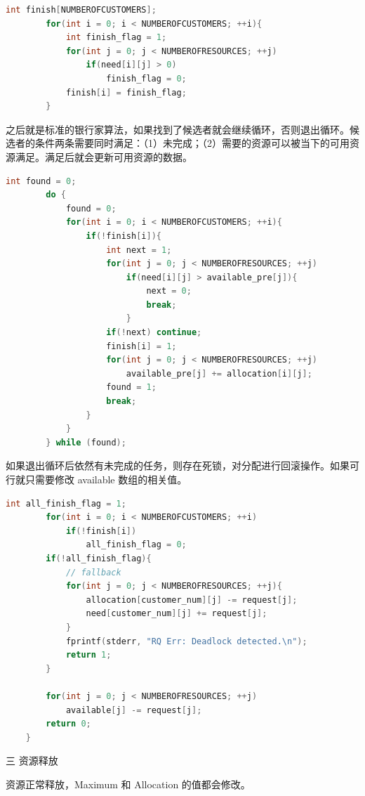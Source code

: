 \documentclass[12pt,a4paper]{article}
\newenvironment{problems}{\begin{list}{}{\renewcommand{\makelabel}[1]{\textbf{##1}\hfil}}}{\end{list}}
\begin{document}
\begin{problems}
\begin{lstlisting}[language=c]
        int finish[NUMBEROFCUSTOMERS];
        for(int i = 0; i < NUMBEROFCUSTOMERS; ++i){
            int finish_flag = 1;
            for(int j = 0; j < NUMBEROFRESOURCES; ++j)
                if(need[i][j] > 0)
                    finish_flag = 0;
            finish[i] = finish_flag;
        }
    \end{lstlisting}

    之后就是标准的银行家算法，如果找到了候选者就会继续循环，否则退出循环。候选者的条件两条需要同时满足：（1）未完成；（2）需要的资源可以被当下的可用资源满足。满足后就会更新可用资源的数据。
    \begin{lstlisting}[language=c]
        int found = 0;
        do {
            found = 0;
            for(int i = 0; i < NUMBEROFCUSTOMERS; ++i){
                if(!finish[i]){
                    int next = 1;
                    for(int j = 0; j < NUMBEROFRESOURCES; ++j)
                        if(need[i][j] > available_pre[j]){
                            next = 0;
                            break;
                        }
                    if(!next) continue;
                    finish[i] = 1;
                    for(int j = 0; j < NUMBEROFRESOURCES; ++j)
                        available_pre[j] += allocation[i][j];
                    found = 1;
                    break;
                }
            }
        } while (found);
    \end{lstlisting}

    如果退出循环后依然有未完成的任务，则存在死锁，对分配进行回滚操作。如果可行就只需要修改 \textsf{available} 数组的相关值。
    \begin{lstlisting}[language=c]
        int all_finish_flag = 1;
        for(int i = 0; i < NUMBEROFCUSTOMERS; ++i)
            if(!finish[i])
                all_finish_flag = 0;
        if(!all_finish_flag){
            // fallback
            for(int j = 0; j < NUMBEROFRESOURCES; ++j){
                allocation[customer_num][j] -= request[j];
                need[customer_num][j] += request[j];
            }
            fprintf(stderr, "RQ Err: Deadlock detected.\n");
            return 1;
        }
    
        for(int j = 0; j < NUMBEROFRESOURCES; ++j)
            available[j] -= request[j];
        return 0;
    }
    \end{lstlisting}

    \item[三] 资源释放
    
    资源正常释放，\textsf{Maximum} 和 \textsf{Allocation} 的值都会修改。


\end{problems}
\end{document}
